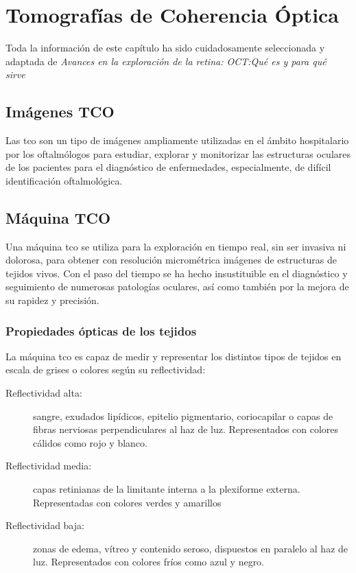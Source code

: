 \chapter{Tomografías de Coherencia Óptica}
Toda la información de este capítulo ha sido cuidadosamente
seleccionada y adaptada de \emph{Avances en la exploración de la
  retina: OCT:\@ Qué es y para qué sirve}~\citep*{oct-bib}

\section{Imágenes TCO}
Las \gls{tco} son un tipo de imágenes ampliamente utilizadas en el
ámbito hospitalario por los oftalmólogos para estudiar, explorar y
monitorizar las estructuras oculares de los pacientes para el
diagnóstico de enfermedades, especialmente, de difícil identificación
oftalmológica.

\section{Máquina TCO}
Una máquina \gls{tco} se utiliza para la exploración en tiempo real,
sin ser invasiva ni dolorosa, para obtener con resolución micrométrica
imágenes de estructuras de tejidos vivos. Con el paso del tiempo se ha
hecho insustituible en el diagnóstico y seguimiento de numerosas
patologías oculares, así como también por la mejora de su rapidez y
precisión.

\subsection{Propiedades ópticas de los tejidos}
La máquina \gls{tco} es capaz de medir y representar los distintos
tipos de tejidos en escala de grises o colores según su reflectividad:
\begin{description}
\item[Reflectividad alta:] sangre, exudados lipídicos, epitelio
  pigmentario, coriocapilar o capas de fibras nerviosas
  perpendiculares al haz de luz. Representados con colores cálidos
  como rojo y blanco.
\item[Reflectividad media:] capas retinianas de la limitante interna a
  la plexiforme externa. Representadas con colores verdes y amarillos
\item[Reflectividad baja:] zonas de edema, vítreo y contenido seroso,
  dispuestos en paralelo al haz de luz. Representados con colores
  fríos como azul y negro.
\end{description}

